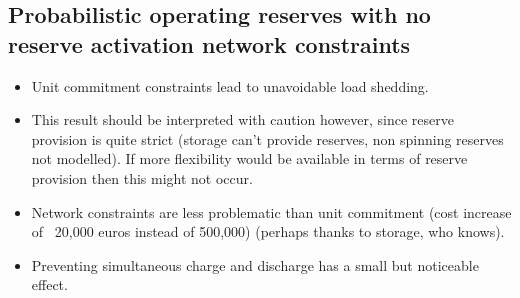 \documentclass[number,times]{elsarticle}
\begin{document}
\subsection{Probabilistic operating reserves with no reserve activation network constraints}

\begin{itemize}
    \item Unit commitment constraints lead to unavoidable load shedding. 
    \item This result should be interpreted with caution however, since reserve provision is quite strict (storage can't provide reserves, non spinning reserves not modelled). If more flexibility would be available in terms of reserve provision then this might not occur.
    \item Network constraints are less problematic than unit commitment (cost increase of ~20,000 euros instead of 500,000) (perhaps thanks to storage, who knows).
    \item Preventing simultaneous charge and discharge has a small but noticeable effect.
\end{itemize}
\end{document}
